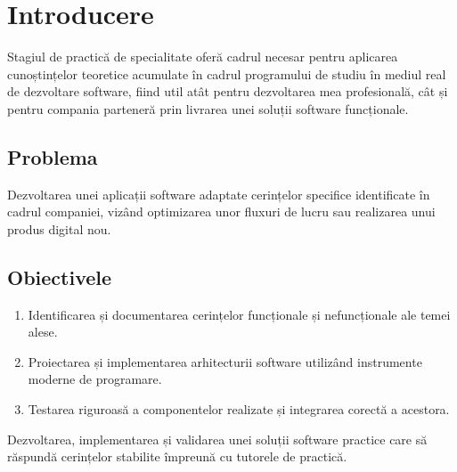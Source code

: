 \chapter{Introducere}
Stagiul de practică de specialitate oferă cadrul necesar pentru aplicarea cunoștințelor teoretice acumulate în cadrul programului de studiu în mediul real de dezvoltare software, fiind util atât pentru dezvoltarea mea profesională, cât și pentru compania parteneră prin livrarea unei soluții software funcționale.

\section{Problema}
Dezvoltarea unei aplicații software adaptate cerințelor specifice identificate în cadrul companiei, vizând optimizarea unor fluxuri de lucru sau realizarea unui produs digital nou.

\section{Obiectivele}
\begin{enumerate}
  \item Identificarea și documentarea cerințelor funcționale și nefuncționale ale temei alese.
  \item Proiectarea și implementarea arhitecturii software utilizând instrumente moderne de programare.
  \item Testarea riguroasă a componentelor realizate și integrarea corectă a acestora.
\end{enumerate}

\begin{ideeprincipala}
Dezvoltarea, implementarea și validarea unei soluții software practice care să răspundă cerințelor stabilite împreună cu tutorele de practică.
\end{ideeprincipala}